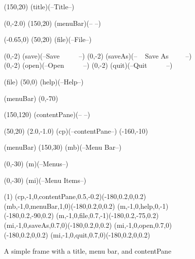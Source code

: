 

\begin {figure}

\Draw


\MinNodeSize(150,20)
\RectNode(title)(--Title--)

\MoveToExit(0,-2.0)
\MinNodeSize(150,20)
\RectNode(menuBar)(-- --)

\MoveToExit(-0.65,0)
\MinNodeSize (50,20)
\RectNode(file)(--File--)

\MoveToExit(0,-2) \Node(save)(--Save ~ ~ ~ --)
\MoveToExit(0,-2) \Node(saveAs)(-- ~ Save As ~ ~ ~--)
\MoveToExit(0,-2) \Node(open)(--Open ~ ~ ~ --)
\MoveToExit(0,-2) \Node(quit)(--Quit ~ ~ ~ --)

\MoveToLoc(file) \Move (50,0)
\RectNode(help)(--Help--)


\MoveToLoc(menuBar) \Move(0,-70)

\MinNodeSize(150,120)
\RectNode(contentPane)(-- --)

\MinNodeSize(50,20)
\MoveToExit(2.0,-1.0)
\Node(cp)(--contentPane--)
\Move(-160,-10)

\MoveToLoc(menuBar)
\Move (150,30)   
\Node(mb)(--Menu Bar--)

\Move (0,-30)
\Node(m)(--Menus--)

\Move (0,-30)
\Node(mi)(--Menu Items--)


\ArrowHeads(1)
\CurvedEdgeAt(cp,-1,0,contentPane,0.5,-0.2)(-180,0.2,0,0.2)
\CurvedEdgeAt(mb,-1,0,menuBar,1,0)(-180,0.2,0,0.2)
\CurvedEdgeAt(m,-1,0,help,0,-1)(-180,0.2,-90,0.2)
\CurvedEdgeAt(m,-1,0,file,0.7,-1)(-180,0.2,-75,0.2)
\CurvedEdgeAt(mi,-1,0,saveAs,0.7,0)(-180,0.2,0,0.2)
\CurvedEdgeAt(mi,-1,0,open,0.7,0)(-180,0.2,0,0.2)
\CurvedEdgeAt(mi,-1,0,quit,0.7,0)(-180,0.2,0,0.2)


\EndDraw


\caption {A simple frame with a title, menu bar, and contentPane}

\label {fig:frame1}

\end {figure}


